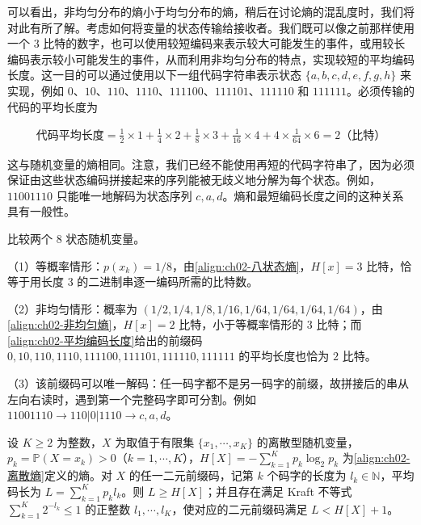 \documentclass[../../main.tex]{subfiles}
\begin{document}
可以看出，非均匀分布的熵小于均匀分布的熵，稍后在讨论熵的混乱度时，我们将对此有所了解。考虑如何将变量的状态传输给接收者。我们既可以像之前那样使用一个 $3$ 比特的数字，也可以使用较短编码来表示较大可能发生的事件，或用较长编码表示较小可能发生的事件，从而利用非均匀分布的特点，实现较短的平均编码长度。这一目的可以通过使用以下一组代码字符串表示状态 $\{a,b,c,d,e,f,g,h\}$ 来实现，例如 $0$、$10$、$110$、$1110$、$111100$、$111101$、$111110$ 和 $111111$。必须传输的代码的平均长度为

\begin{align}
  \text{代码平均长度} = \frac{1}{2}\times1 + \frac{1}{4}\times2 + \frac{1}{8}\times3 + \frac{1}{16}\times4 + 4\times\frac{1}{64}\times6 = 2 \text{（比特）}
  \label{align:ch02-平均编码长度}
\end{align}

这与随机变量的熵相同。注意，我们已经不能使用再短的代码字符串了，因为必须保证由这些状态编码拼接起来的序列能被无歧义地分解为每个状态。例如，$11001110$ 只能唯一地解码为状态序列 $c,a,d$。熵和最短编码长度之间的这种关系具有一般性。

\begin{example}[ 熵与平均编码长度]\label{example:ch02-熵与编码}
比较两个 $8$ 状态随机变量。

（1）等概率情形：$p(x_k)=1/8$，由\eqref{align:ch02-八状态熵}，$H[x]=3$ 比特，恰等于用长度 $3$ 的二进制串逐一编码所需的比特数。

（2）非均匀情形：概率为 $(1/2,1/4,1/8,1/16,1/64,1/64,1/64,1/64)$，由\eqref{align:ch02-非均匀熵}，$H[x]=2$ 比特，小于等概率情形的 $3$ 比特；而\eqref{align:ch02-平均编码长度}给出的前缀码 $0,10,110,1110,111100,111101,111110,111111$ 的平均长度也恰为 $2$ 比特。

（3）该前缀码可以唯一解码：任一码字都不是另一码字的前缀，故拼接后的串从左向右读时，遇到第一个完整码字即可分割。例如 $11001110\to110|0|1110\to c,a,d$。
\end{example}

\begin{theorem}[无噪编码定理]\label{theorem:ch02-无噪编码定理}
设 $K\geqslant2$ 为整数，$X$ 为取值于有限集 $\{x_1,\cdots,x_K\}$ 的离散型随机变量，$p_k=\mathbb{P}(X=x_k)>0$（$k=1,\cdots,K$），$H[X]=-\sum_{k=1}^{K}p_k\log_2 p_k$ 为\eqref{align:ch02-离散熵}定义的熵。对 $X$ 的任一二元前缀码，记第 $k$ 个码字的长度为 $l_k\in\mathbb{N}$，平均码长为 $L=\sum_{k=1}^{K}p_k l_k$。则 $L\geqslant H[X]$；并且存在满足 Kraft 不等式 $\sum_{k=1}^{K}2^{-l_k}\leqslant1$ 的正整数 $l_1,\cdots,l_K$，使对应的二元前缀码满足 $L<H[X]+1$。
\end{theorem}
\end{document}
